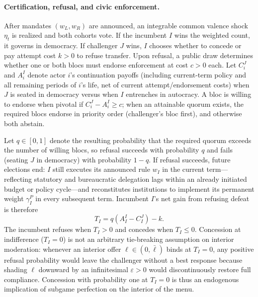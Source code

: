 \documentclass[11pt,letterpaper]{article}
\begin{document}
\paragraph{Certification, refusal, and civic enforcement.}
After mandates $(w_L,w_R)$ are announced, an integrable common valence shock $\eta_t$ is realized and both cohorts vote. If the incumbent $I$ wins the weighted count, it governs in democracy. If challenger $J$ wins, $I$ chooses whether to concede or pay attempt cost $k>0$ to refuse transfer. Upon refusal, a public draw determines whether one or both blocs must endorse enforcement at cost $c>0$ each. Let $C_i^J$ and $A_i^I$ denote actor $i$'s continuation payoffs (including current-term policy and all remaining periods of $i$'s life, net of current attempt/endorsement costs) when $J$ is seated in democracy versus when $I$ entrenches in autocracy. A bloc is willing to endorse when pivotal if $C_i^J-A_i^I\ge c$; when an attainable quorum exists, the required blocs endorse in priority order (challenger's bloc first), and otherwise both abstain.

Let $q\in[0,1]$ denote the resulting probability that the required quorum exceeds the number of willing blocs, so refusal succeeds with probability $q$ and fails (seating $J$ in democracy) with probability $1-q$. If refusal succeeds, future elections end: $I$ still executes its announced rule $w_I$ in the current term---reflecting statutory and bureaucratic delegation lags within an already initiated budget or policy cycle---and reconstitutes institutions to implement its permanent weight $\gamma_I^P$ in every subsequent term. Incumbent $I$'s net gain from refusing defeat is therefore
\begin{equation}
 T_I=q(A_I^I-C_I^J)-k .
 \label{eq:gain}
\end{equation}
The incumbent refuses when $T_I>0$ and concedes when $T_I\le 0$. Concession at indifference ($T_I=0$) is not an arbitrary tie-breaking assumption on interior moderation: whenever an interior offer $\ell\in(0,\bar\ell)$ binds at $T_I=0$, any positive refusal probability would leave the challenger without a best response because shading $\ell$ downward by an infinitesimal $\varepsilon>0$ would discontinuously restore full compliance. Concession with probability one at $T_I=0$ is thus an endogenous implication of subgame perfection on the interior of the menu.
\end{document}
